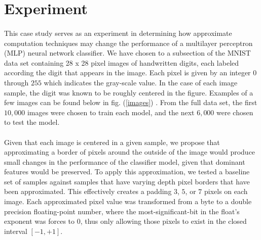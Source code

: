 \documentclass[12pt,letterpaper]{article}
\begin{document}

\section*{Experiment}

\paragraph*{}This case study serves as an experiment in determining how approximate computation techniques may change the performance of a multilayer perceptron (MLP) neural network classifier. We have chosen to a subsection of the MNIST data set containing 28 x 28 pixel images of handwritten digits, each labeled according the digit that appears in the image. Each pixel is given by an integer $0$ through $255$ which indicates the gray-scale value. In the case of each image sample, the digit was known to be roughly centered in the figure. Examples of a few images can be found below in fig. (\ref{images}) . From the full data set, the first $10,000$ images were chosen to train each model, and the next $6,000$ were chosen to test the model.

\paragraph*{}Given that each image is centered in a given sample, we propose that approximating a border of pixels around the outside of the image would produce small changes in the performance of the classifier model, given that dominant features would be preserved. To apply this approximation, we tested a baseline set of samples against samples that have varying depth pixel borders that have been approximated. This effectively creates a padding  $3$, $5$, or $7$ pixels on each image. Each approximated pixel value was transformed from a byte to a double precision floating-point number, where the most-significant-bit in the float's exponent was forces to $0$, thus only allowing those pixels to exist in the closed interval $[-1,+1]$.
\end{document}
